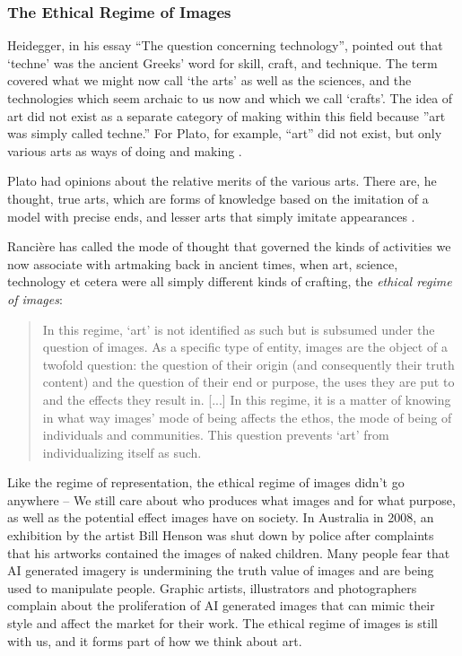 \documentclass[letterpaper]{article}
\begin{document}
    \subsubsection{The Ethical Regime of Images}

    Heidegger, in his essay “The question concerning technology”, pointed out that ‘techne’ was the ancient Greeks' word for skill, craft, and technique. The term covered what we might now call ‘the arts’ as well as the sciences, and the technologies which seem archaic to us now and which we call ‘crafts’. The idea of art did not exist as a separate category of making within this field because ”art was simply called techne.” \citep[p34]{HeideggerThQstnCncrngTchnlgy1954} For Plato, for example, “art” did not exist, but only various arts as ways of doing and making \citep[p.20]{RancierPltcsOfThAsthtcs2004}. 

    Plato had opinions about the relative merits of the various arts. There are, he thought, true arts, which are forms of knowledge based on the imitation of a model with precise ends, and lesser arts that simply imitate appearances \citep[p.20]{RancierPltcsOfThAsthtcs2004}.

    Rancière has called the mode of thought that governed the kinds of activities we now associate with artmaking back in ancient times, when art, science, technology et cetera were all simply different kinds of crafting, the \emph{ethical regime of images}:

    \begin{quote}
        In this regime, ‘art’ is not identified as such but is subsumed under the question of images. As a specific type of entity, images are the object of a twofold question: the question of their origin (and consequently their truth content) and the question of their end or purpose, the uses they are put to and the effects they result in. [...] In this regime, it is a matter of knowing in what way images' mode of being affects the ethos, the mode of being of individuals and communities. This question prevents ‘art’ from individualizing itself as such. \citep[pp.20–21]{RancierPltcsOfThAsthtcs2004}
    \end{quote}

    Like the regime of representation, the ethical regime of images didn't go anywhere – We still care about who produces what images and for what purpose, as well as the potential effect images have on society. In Australia in 2008, an exhibition by the artist Bill Henson was shut down by police after complaints that his artworks contained the images of naked children. Many people fear that AI generated imagery is undermining the truth value of images and are being used to manipulate people. Graphic artists, illustrators and photographers complain about the proliferation of AI generated images that can mimic their style and affect the market for their work. The ethical regime of images is still with us, and it forms part of how we think about art. 
\end{document}

